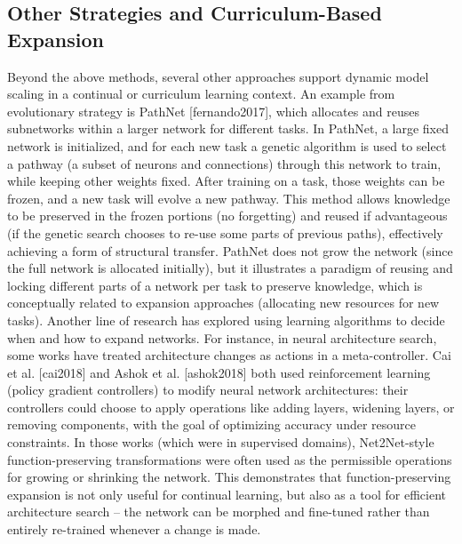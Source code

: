 \subsection{Other Strategies and Curriculum-Based Expansion}
Beyond the above methods, several other approaches support dynamic model scaling in a continual or curriculum learning context. An example from evolutionary strategy is PathNet [fernando2017], which allocates and reuses subnetworks within a larger network for different tasks. In PathNet, a large fixed network is initialized, and for each new task a genetic algorithm is used to select a pathway (a subset of neurons and connections) through this network to train, while keeping other weights fixed. After training on a task, those weights can be frozen, and a new task will evolve a new pathway. This method allows knowledge to be preserved in the frozen portions (no forgetting) and reused if advantageous (if the genetic search chooses to re-use some parts of previous paths), effectively achieving a form of structural transfer. PathNet does not grow the network (since the full network is allocated initially), but it illustrates a paradigm of reusing and locking different parts of a network per task to preserve knowledge, which is conceptually related to expansion approaches (allocating new resources for new tasks). Another line of research has explored using learning algorithms to decide when and how to expand networks. For instance, in neural architecture search, some works have treated architecture changes as actions in a meta-controller. Cai et al. [cai2018] and Ashok et al. [ashok2018] both used reinforcement learning (policy gradient controllers) to modify neural network architectures: their controllers could choose to apply operations like adding layers, widening layers, or removing components, with the goal of optimizing accuracy under resource constraints. In those works (which were in supervised domains), Net2Net-style function-preserving transformations were often used as the permissible operations for growing or shrinking the network. This demonstrates that function-preserving expansion is not only useful for continual learning, but also as a tool for efficient architecture search – the network can be morphed and fine-tuned rather than entirely re-trained whenever a change is made.

